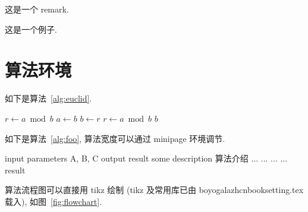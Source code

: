 \begin{remark}\label{rem:remark}
这是一个 remark.
\end{remark}

\begin{example}
这是一个例子.
\end{example}


\clearpage
\section{算法环境}

如下是算法~\ref{alg:euclid}.
\begin{algorithm}[H]
\small
\caption{~Euclid's algorithm}\label{alg:euclid}
\begin{algorithmic}[1]
  \State $r\gets a\bmod b$
  \State $a\gets b$
  \State $b\gets r$
  \State $r\gets a\bmod b$
  \EndWhile\label{euclidendwhile}
  \State \Return $b$
  \EndProcedure
\end{algorithmic}
\end{algorithm}


如下是算法~\ref{alg:foo}, 算法宽度可以通过 minipage 环境调节.
\begin{center}
\vspace{-2ex}
\begin{minipage}{.9\linewidth}
\begin{algorithm}[H]
\caption{~算法的名字}\label{alg:foo}
\begin{algorithmic}[1]
\Require input parameters A, B, C
\Ensure output result
\State some description 算法介绍
  \State ...
    \State ...
    \Else
    \State ...
  \EndIf
\EndFor
{}
  \State ...
\EndWhile
\State \Return result
\end{algorithmic}
\end{algorithm}
\end{minipage}
\end{center}

算法流程图可以直接用 tikz 绘制 (tikz 及常用库已由 boyogalazhcnbooksetting.tex 载入), 如图~\ref{fig:flowchart}.


